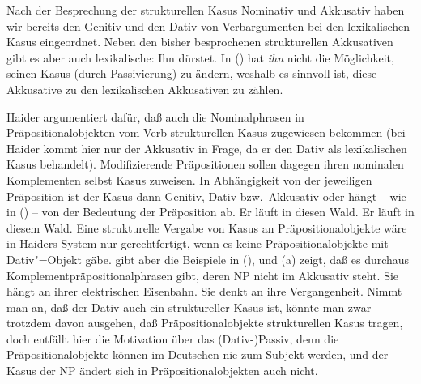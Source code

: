 Nach der Besprechung der strukturellen Kasus Nominativ und Akkusativ haben wir bereits den Genitiv und den
Dativ von Verbargumenten bei den lexikalischen Kasus eingeordnet. Neben den bisher besprochenen
strukturellen Akkusativen gibt es aber auch lexikalische:
\ea Ihn dürstet.
\z
In () hat \emph{ihn} nicht die Möglichkeit, seinen Kasus (\zb durch Passivierung) zu ändern,
weshalb es sinnvoll ist, diese Akkusative zu den lexikalischen Akkusativen zu zählen.

%
Haider argumentiert dafür, daß auch die Nominalphrasen
in Präpositionalobjekten vom Verb strukturellen Kasus zugewiesen bekommen
(bei Haider kommt hier nur der Akkusativ in Frage, da er den Dativ als lexikalischen Kasus behandelt).
Modifizierende Präpositionen sollen dagegen ihren nominalen Komplementen selbst Kasus zuweisen.
In Abhängigkeit von der jeweiligen Präposition ist der Kasus dann Genitiv, Dativ bzw.\
Akkusativ oder hängt -- wie in () -- von der Bedeutung der Präposition ab.
\eal
\ex Er läuft in diesen Wald.
\ex Er läuft in diesem Wald.
\zl
Eine strukturelle Vergabe von Kasus an Präpositionalobjekte wäre in Haiders
System nur gerechtfertigt, wenn es keine Präpositionalobjekte mit Dativ"=Objekt gäbe.
\citet[\page 78]{Eisenberg94a} gibt aber die Beispiele in (\mex{1}), und (\mex{1}a) zeigt,
daß es durchaus Komplementpräpositionalphrasen gibt, deren NP nicht im Akkusativ steht.
\eal
\ex Sie hängt an ihrer elektrischen Eisenbahn.
\ex Sie denkt an ihre Vergangenheit.
\zl
Nimmt man an, daß der Dativ auch ein struktureller Kasus ist, könnte man zwar
trotzdem davon ausgehen, daß Präpositionalobjekte strukturellen Kasus tragen, doch
entfällt hier die Motivation über das (Dativ-)Passiv, denn die Präpositionalobjekte
können im Deutschen nie zum Subjekt werden, und der Kasus der NP ändert sich in
Präpositionalobjekten auch nicht.

